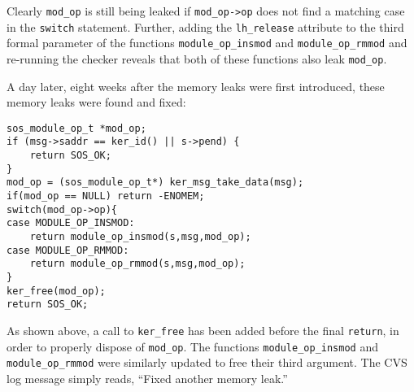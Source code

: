 Clearly {\tt mod\_op} is still being leaked if {\tt mod\_op->op} does
not find a matching case in the {\tt switch} statement.  Further,
adding the {\tt lh\_release} attribute to the third formal parameter
of the functions {\tt module\_op\_insmod} and {\tt module\_op\_rmmod}
and re-running the checker reveals that both of these functions also
leak {\tt mod\_op}.

A day later, eight weeks after the memory leaks were first introduced,
these memory leaks were found and fixed:

\begin{scriptsize}
\begin{verbatim}
sos_module_op_t *mod_op;
if (msg->saddr == ker_id() || s->pend) {
    return SOS_OK;
}
mod_op = (sos_module_op_t*) ker_msg_take_data(msg);
if(mod_op == NULL) return -ENOMEM;
switch(mod_op->op){
case MODULE_OP_INSMOD:
    return module_op_insmod(s,msg,mod_op);
case MODULE_OP_RMMOD:
    return module_op_rmmod(s,msg,mod_op);
}
ker_free(mod_op);
return SOS_OK;
\end{verbatim}
\end{scriptsize}

As shown above, a call to {\tt ker\_free} has been added before the
final {\tt return}, in order to properly dispose of {\tt mod\_op}.
The functions {\tt module\_op\_insmod} and {\tt module\_op\_rmmod}
were similarly updated to free their third argument.  The CVS log message simply
reads, ``Fixed another memory leak.''  






